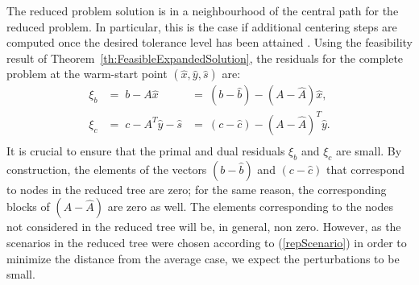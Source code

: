 
The reduced problem solution is in a neighbourhood of the central path 
for the reduced problem. In particular, this is the case if additional 
centering steps are computed once the desired tolerance level has been 
attained \cite{Gondzio98}. 
Using the feasibility result of Theorem~\ref{th:FeasibleExpandedSolution},
the residuals for the complete problem at the warm-start point 
$(\hat{x}, \hat{y}, \hat{s})$ are:
\[
\begin{array}{rll}
  \xi_b \!\!&=\; b-A\hat x           \!\!&=\: (b-\hat b)-(A-\hat A)\hat x,  \\
  \xi_c \!\!&=\; c -A^T\hat y-\hat s \!\!&=\: (c-\hat c)-(A-\hat A)^T\hat y.\\ 
\end{array}
\]
%
It is crucial to ensure that the primal and dual residuals 
$\xi_b$ and $\xi_c$ are small. 
By construction, the elements of the vectors 
$(b-\hat{b})$ and $(c-\hat{c})$ that correspond to nodes in the reduced 
tree are zero; for the same reason, the corresponding blocks of 
$(A-\hat{A})$ are zero as well.
%
The elements corresponding to the nodes not considered in the reduced 
tree will be, in general, non zero. However, as the scenarios 
in the reduced tree were chosen according to (\ref{repScenario}) 
in order to minimize the distance 
from the average case, we expect the perturbations to be small. 

